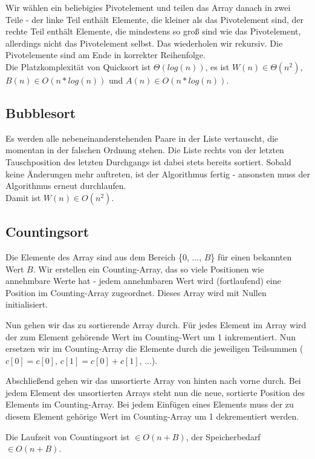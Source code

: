 \documentclass[12pt]{article}
\begin{document}
Wir wählen ein beliebigies Pivotelement und teilen das Array danach in zwei Teile - der linke Teil enthält Elemente, die kleiner als das Pivotelement sind, der rechte Teil enthält Elemente, die mindestens so groß sind wie das Pivotelement, allerdings nicht das Pivotelement selbst. Das wiederholen wir rekursiv. Die Pivotelemente sind am Ende in korrekter Reihenfolge.\\

Die Platzkomplexität von Quicksort ist $\Theta(log(n))$, es ist $W(n) \in \Theta(n^2)$, $B(n) \in O(n*log(n))$ und $A(n) \in O(n*log(n))$.

\subsection{Bubblesort}

Es werden alle nebeneinanderstehenden Paare in der Liste vertauscht, die momentan in der falschen Ordnung stehen. Die Liste rechts von der letzten Tauschposition des letzten Durchgangs ist dabei stets bereits sortiert. Sobald keine Änderungen mehr auftreten, ist der Algorithmus fertig - ansonsten muss der Algorithmus erneut durchlaufen.\\

Damit ist $W(n) \in O(n^2)$.

\subsection{Countingsort}

Die Elemente des Array sind aus dem Bereich \{0, ..., $B$\} für einen bekannten Wert $B$. Wir erstellen ein Counting-Array, das so viele Positionen wie annehmbare Werte hat - jedem annehmbaren Wert wird (fortlaufend) eine Position im Counting-Array zugeordnet. Dieses Array wird mit Nullen initialisiert.

Nun gehen wir das zu sortierende Array durch. Für jedes Element im Array wird der zum Element gehörende Wert im Counting-Wert um 1 inkrementiert. Nun ersetzen wir im Counting-Array die Elemente durch die jeweiligen Teilsummen ($c[0] = c[0]$, $c[1] = c[0] + c[1]$, ...).

Abschließend gehen wir das unsortierte Array von hinten nach vorne durch. Bei jedem Element des unsortierten Arrays steht nun die neue, sortierte Position des Elements im Counting-Array. Bei jedem Einfügen eines Elements muss der zu diesem Element gehörige Wert im Counting-Array um 1 dekrementiert werden.

Die Laufzeit von Countingsort ist $\in O(n+B)$, der Speicherbedarf $\in O(n+B)$.
\end{document}
